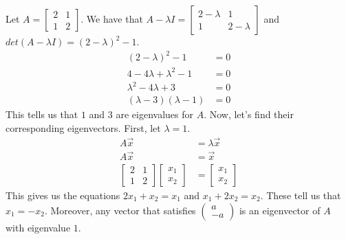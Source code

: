 \begin{example}
    Let $A=\begin{bmatrix}
        2 & 1 \\
        1 & 2
    \end{bmatrix}$. We have that $A-\lambda I=\begin{bmatrix}
        2 - \lambda & 1\\
        1 & 2 - \lambda
    \end{bmatrix}$ and $det(A-\lambda I)=(2-\lambda)^2-1$.
    \begin{align*}
        (2-\lambda)^2-1&=0\\
        4-4\lambda+\lambda^2-1&=0\\
        \lambda^2-4\lambda+3&=0\\
        (\lambda -3)(\lambda-1)&=0
    \end{align*}
    This tells us that $1$ and $3$ are eigenvalues for $A$. Now, let's find their corresponding eigenvectors. First, let $\lambda=1$.
    \begin{align*}
        A\vec{x}&=\lambda\vec{x}\\
        A\vec{x}&=\vec{x}\\
        \begin{bmatrix}
            2 & 1\\
            1 & 2
        \end{bmatrix}\begin{bmatrix}
            x_1 \\ x_2
        \end{bmatrix}&=\begin{bmatrix}
            x_1 \\ x_2
        \end{bmatrix}
    \end{align*}
    This gives us the equations $2x_1+x_2=x_1$ and $x_1+2x_2=x_2$. These tell us that $x_1=-x_2$. Moreover, any vector that satisfies $\begin{pmatrix}
        a \\ -a
    \end{pmatrix}$ is an eigenvector of $A$ with eigenvalue $1$.


\end{example}
